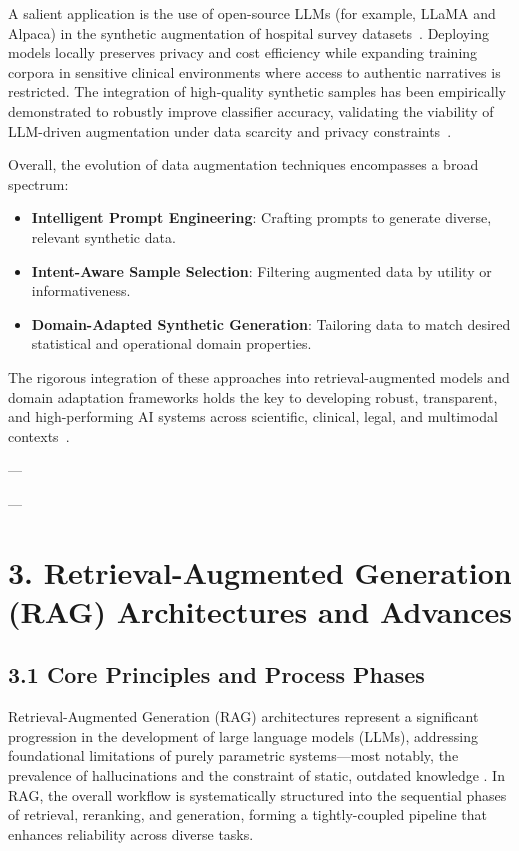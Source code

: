 \documentclass[11pt]{article}
\begin{document}
A salient application is the use of open-source LLMs (for example, LLaMA and Alpaca) in the synthetic augmentation of hospital survey datasets~\cite{ref57}. Deploying models locally preserves privacy and cost efficiency while expanding training corpora in sensitive clinical environments where access to authentic narratives is restricted. The integration of high-quality synthetic samples has been empirically demonstrated to robustly improve classifier accuracy, validating the viability of LLM-driven augmentation under data scarcity and privacy constraints~\cite{ref57}.

Overall, the evolution of data augmentation techniques encompasses a broad spectrum:

\begin{itemize}
    \item \textbf{Intelligent Prompt Engineering}: Crafting prompts to generate diverse, relevant synthetic data.
    \item \textbf{Intent-Aware Sample Selection}: Filtering augmented data by utility or informativeness.
    \item \textbf{Domain-Adapted Synthetic Generation}: Tailoring data to match desired statistical and operational domain properties.
\end{itemize}

The rigorous integration of these approaches into retrieval-augmented models and domain adaptation frameworks holds the key to developing robust, transparent, and high-performing AI systems across scientific, clinical, legal, and multimodal contexts~\cite{ref5,ref10,ref12,ref15,ref16,ref22,ref24,ref31,ref32,ref36,ref37,ref43,ref48,ref49,ref52,ref54,ref55,ref61,ref62,ref57}.

---

---
\section{3. Retrieval-Augmented Generation (RAG) Architectures and Advances}

\subsection{3.1 Core Principles and Process Phases}

Retrieval-Augmented Generation (RAG) architectures represent a significant progression in the development of large language models (LLMs), addressing foundational limitations of purely parametric systems—most notably, the prevalence of hallucinations and the constraint of static, outdated knowledge \cite{ref4,ref5,ref8,ref10,ref14,ref15,ref16,ref17,ref35,ref36,ref37,ref42,ref52,ref54,ref55,ref64}. In RAG, the overall workflow is systematically structured into the sequential phases of retrieval, reranking, and generation, forming a tightly-coupled pipeline that enhances reliability across diverse tasks.
\end{document}
